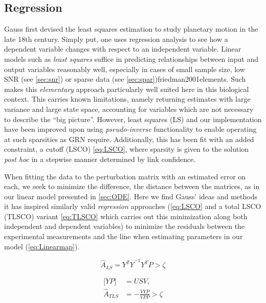 \subsection{Regression}
\label{sec:regress}
Gauss first devised the least squares estimation to study planetary motion in the late 18th century. Simply put, one uses regression analysis to see how a dependent variable changes with respect to an independent variable. Linear models such as \emph{least squares} suffice in predicting relationships between input and output variables reasonably well, especially in cases of small sample size, low SNR (see \cref{sec:snr}) or sparse data (see \cref{sec:spar}){friedman2001elements}. Such makes this \emph{elementary} approach particularly well suited here in this biological context. This carries known limitations, namely returning estimates with large variance and large state space, \ie accounting for variables which are not necessary to describe the ``big picture''\citep[p.57]{friedman2001elements}. However, least squares (LS) and our implementation have been improved upon using \emph{pseudo-inverse} functionality \citep{carlson1974generalization} to enable operating at such sparsities as GRN require. Additionally, this has been fit with an added constraint, a cutoff (LSCO) \cref{eq:LSCO}, where sparsity is given to the solution \emph{post hoc} in a stepwise manner determined by link confidence.

When fitting the data to the perturbation matrix with an estimated error on each, we seek to minimize the difference, the distance between the matrices, as in our linear model presented in \cref{sec:ODE}. Here we find Gauss' ideas and methods it has inspired similarly valid \emph{regression} approaches (\cref{eq:LSCO} and a total LSCO (TLSCO) variant \cref{eq:TLSCO} \citep{de1998introduction} which carries out this minimization along both independent and dependent variables) to minimize the residuals between the experimental measurements and the line when estimating parameters in our model (\cref{eq:Linearmap}).

  \begin{equation}
       \hat{A}_{LS}={{Y^TY}^{-1} Y^TP} > \zeta
 \label{eq:LSCO}
 \end{equation}

\begin{equation}
  \begin{aligned}
    \lbrack Y P\rbrack &= U S V , \\
    \hat{A}_{TLS} &= -\frac{VYP}{VPP} > \zeta
 \label{eq:TLSCO}
 \end{aligned}
 \end{equation}

